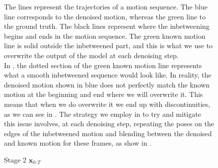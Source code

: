 \begin{figure}
    \centering
    \hfil
    \hfil
    \caption{Stage 2 $\mathbf{x}_{0:T}$}
    \label{fig:diffusion_inbetweening_blending}
    \medskip
    \small
    \raggedright
    The lines represent the trajectories of a motion sequence. The blue line corresponds to the denoised motion, whereas the green line to the ground truth. The black lines represent where the inbetweening begins and ends in the motion sequence. The green known motion line is solid outside the inbetweened part, and this is what we use to overwrite the output of the model at each denoising step.\\
    In \protect{}, the dotted section of the green known motion line represents what a smooth inbetweened sequence would look like. In reality, the denoised motion shown in blue does not perfectly match the known motion at the beginning and end where we will overwrite it. This means that when we do overwrite it we end up with discontinuities, as we can see in \protect{}. The strategy we employ in  to try and mitigate this issue involves, at each denoising step, repeating the poses on the edges of the inbetweened motion and blending between the denoised and known motion for these frames, as show in \protect{}.
\end{figure}


